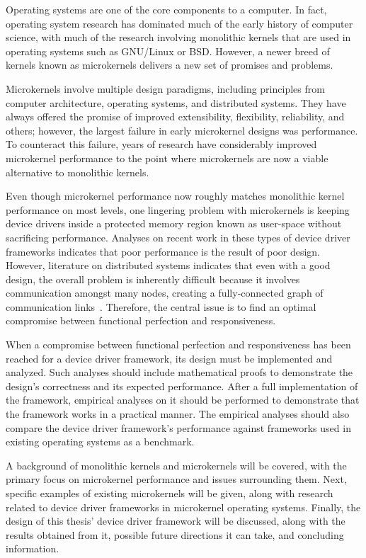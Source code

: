 
Operating systems are one of the core components to a computer.
In fact, operating system research has dominated much of the
early history of computer science, with much of the research
involving monolithic kernels that are used in operating systems
such as GNU/Linux or BSD.  However, a newer breed of kernels known
as microkernels delivers a new set of promises and problems.

Microkernels involve multiple design paradigms, including principles from
computer architecture, operating systems, and distributed systems.
They have always offered the promise of improved extensibility,
flexibility, reliability, and others; however, the largest
failure in early microkernel designs was performance.  To counteract
this failure, years of research have considerably improved
microkernel performance to the point where microkernels are now a
viable alternative to monolithic kernels.

Even though microkernel performance now roughly matches monolithic
kernel performance on most levels, one lingering problem with
microkernels is keeping device
drivers inside a protected memory region known as user-space without
sacrificing performance.  Analyses on recent work in these types of
device driver frameworks indicates that poor performance
is the result of poor design.  However, literature on
distributed systems indicates that even with a good design, the
overall problem is inherently difficult because it involves
communication amongst many nodes, creating a fully-connected graph of
communication links~\cite{cormen2001, tanenbaum2002}.
Therefore, the central issue is to find an optimal compromise between
functional perfection and responsiveness.

When a compromise between functional perfection and responsiveness
has been reached for a device driver framework, its design must be implemented
and analyzed.  Such analyses should include mathematical proofs to
demonstrate the design's correctness and its expected performance.
After a full implementation of the framework, empirical analyses on it
should be performed to demonstrate that the framework works in a practical
manner.  The empirical analyses should also compare the device driver
framework's performance against frameworks used in existing operating
systems as a benchmark.

A background of monolithic kernels and microkernels will be covered, with the
primary focus on microkernel performance and issues surrounding them.  Next,
specific examples of existing microkernels will be given, along with research
related to device driver frameworks in microkernel operating systems.
Finally, the design of this thesis' device driver framework will be discussed,
along with the results obtained from it, possible future directions it can
take, and concluding information.
